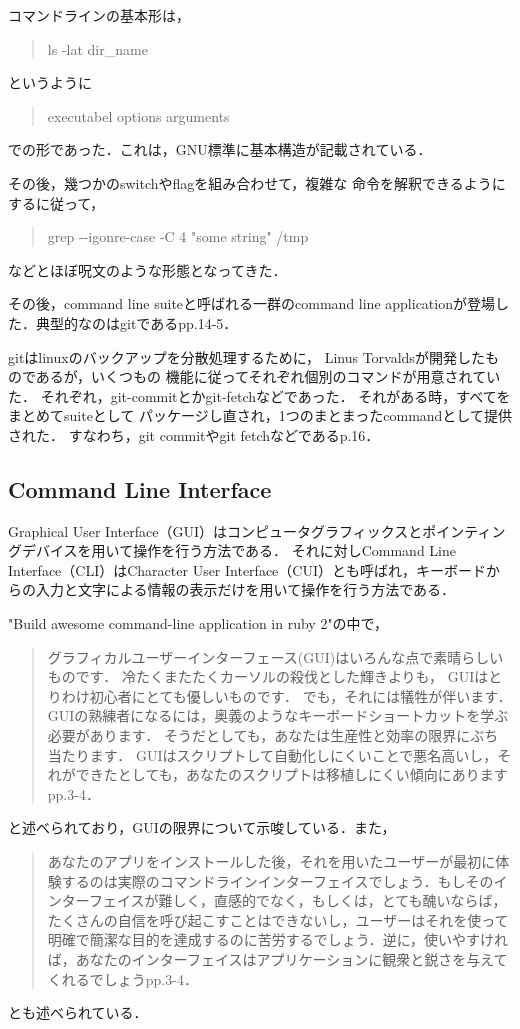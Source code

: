 コマンドラインの基本形は，

\begin{quote}
ls -lat dir\_name
\end{quote}
というように

\begin{quote}
executabel options arguments
\end{quote}
での形であった．これは，GNU標準に基本構造が記載されている．

その後，幾つかのswitchやflagを組み合わせて，複雑な
命令を解釈できるようにするに従って，

\begin{quote}
grep -\/-igonre-case -C 4 "some string" /tmp
\end{quote}
などとほぼ呪文のような形態となってきた．

その後，command line suiteと呼ばれる一群のcommand line
applicationが登場した．典型的なのはgitである\cite{awesome}pp.14-5．

gitはlinuxのバックアップを分散処理するために， Linus
Torvaldsが開発したものであるが，いくつもの
機能に従ってそれぞれ個別のコマンドが用意されていた．
それぞれ，git-commitとかgit-fetchなどであった．
それがある時，すべてをまとめてsuiteとして
パッケージし直され，1つのまとまったcommandとして提供された．
すなわち，git commitやgit fetchなどである\cite{awesome}p.16．

\subsection{Command Line Interface}\label{}

Graphical User Interface（GUI）はコンピュータグラフィックスとポインティングデバイスを用いて操作を行う方法である．
それに対しCommand Line Interface（CLI）はCharacter User Interface（CUI）とも呼ばれ，キーボードからの入力と文字による情報の表示だけを用いて操作を行う方法である．

 "Build awesome command-line application in ruby 2"の中で，

\begin{quote}
グラフィカルユーザーインターフェース(GUI)はいろんな点で素晴らしいものです． 冷たくまたたくカーソルの殺伐とした輝きよりも， GUIはとりわけ初心者にとても優しいものです． でも，それには犠牲が伴います．GUIの熟練者になるには，奥義のようなキーボードショートカットを学ぶ必要があります． そうだとしても，あなたは生産性と効率の限界にぶち当たります． GUIはスクリプトして自動化しにくいことで悪名高いし，それができたとしても，あなたのスクリプトは移植しにくい傾向にあります\cite{awesome}pp.3-4．
\end{quote}

と述べられており，GUIの限界について示唆している．また，

\begin{quote}
あなたのアプリをインストールした後，それを用いたユーザーが最初に体験するのは実際のコマンドラインインターフェイスでしょう．もしそのインターフェイスが難しく，直感的でなく，もしくは，とても醜いならば，たくさんの自信を呼び起こすことはできないし，ユーザーはそれを使って明確で簡潔な目的を達成するのに苦労するでしょう．逆に，使いやすければ，あなたのインターフェイスはアプリケーションに観衆と鋭さを与えてくれるでしょう\cite{awesome}pp.3-4．
\end{quote}

とも述べられている．
